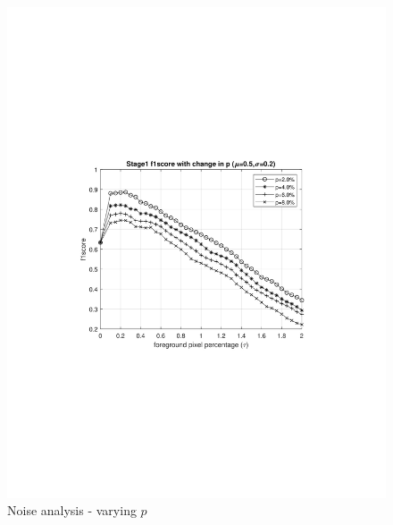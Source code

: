 \begin{figure}[ht]
    \centering
    \includegraphics[width=\linewidth,trim={300 670 300 690},clip]{images/noise-analysis-mog-p.jpg}
    \caption{Noise analysis - varying $p$}
    \label{fig:noise-analysis-mog-p}
\end{figure}

